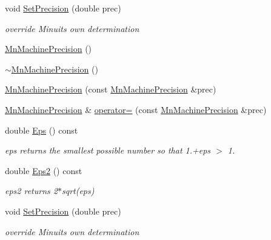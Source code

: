 \begin{DoxyCompactItemize}
void \mbox{\hyperlink{classROOT_1_1Minuit2_1_1MnMachinePrecision_a625938e3c6362a06d09fc76e59f366b6}{Set\+Precision}} (double prec)
\begin{DoxyCompactList}\small\item\em override Minuit\textquotesingle{}s own determination \end{DoxyCompactList}\item 
\mbox{\hyperlink{classROOT_1_1Minuit2_1_1MnMachinePrecision_aa40e069e8ca7ffc87ac53cdfebaf6316}{Mn\+Machine\+Precision}} ()
\item 
\mbox{\hyperlink{classROOT_1_1Minuit2_1_1MnMachinePrecision_abcef7b80562b246252decc15b6fabc71}{$\sim$\+Mn\+Machine\+Precision}} ()
\item 
\mbox{\hyperlink{classROOT_1_1Minuit2_1_1MnMachinePrecision_a7b8520f8d3479d7dd1b91a3bc3236281}{Mn\+Machine\+Precision}} (const \mbox{\hyperlink{classROOT_1_1Minuit2_1_1MnMachinePrecision}{Mn\+Machine\+Precision}} \&prec)
\item 
\mbox{\hyperlink{classROOT_1_1Minuit2_1_1MnMachinePrecision}{Mn\+Machine\+Precision}} \& \mbox{\hyperlink{classROOT_1_1Minuit2_1_1MnMachinePrecision_a89ded7be0c8fe34ad55585e45a078355}{operator=}} (const \mbox{\hyperlink{classROOT_1_1Minuit2_1_1MnMachinePrecision}{Mn\+Machine\+Precision}} \&prec)
\item 
double \mbox{\hyperlink{classROOT_1_1Minuit2_1_1MnMachinePrecision_a3a56da6043c5df1a98e5c8b1aa9f6d9f}{Eps}} () const
\begin{DoxyCompactList}\small\item\em eps returns the smallest possible number so that 1.+eps $>$ 1. \end{DoxyCompactList}\item 
double \mbox{\hyperlink{classROOT_1_1Minuit2_1_1MnMachinePrecision_aa71de131bc08f19d18dfeba4cb8191ce}{Eps2}} () const
\begin{DoxyCompactList}\small\item\em eps2 returns 2$\ast$sqrt(eps) \end{DoxyCompactList}\item 
void \mbox{\hyperlink{classROOT_1_1Minuit2_1_1MnMachinePrecision_a625938e3c6362a06d09fc76e59f366b6}{Set\+Precision}} (double prec)
\begin{DoxyCompactList}\small\item\em override Minuit\textquotesingle{}s own determination \end{DoxyCompactList}\end{DoxyCompactItemize}


